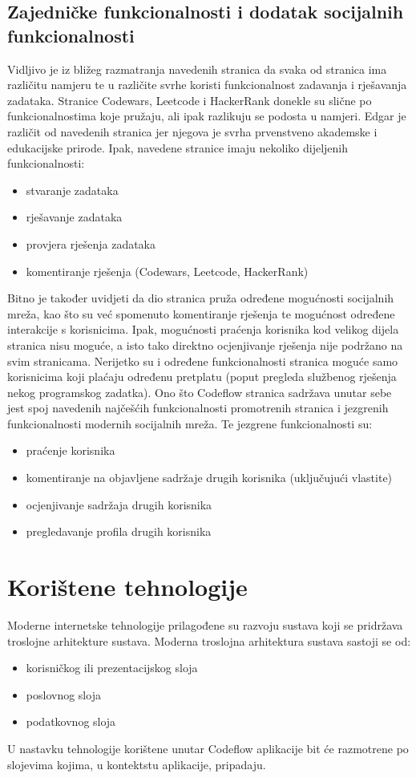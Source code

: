 \documentclass[times, utf8, zavrsni]{fer}
\begin{document}
		\section{Zajedničke funkcionalnosti i dodatak socijalnih funkcionalnosti}
		Vidljivo je iz bližeg razmatranja navedenih stranica da svaka od stranica ima različitu namjeru te u različite svrhe koristi funkcionalnost zadavanja i rješavanja zadataka. Stranice Codewars, Leetcode i HackerRank donekle su slične po funkcionalnostima koje pružaju, ali ipak razlikuju se podosta u namjeri. Edgar je različit od navedenih stranica jer njegova je svrha prvenstveno akademske i edukacijske prirode. Ipak, navedene stranice imaju nekoliko dijeljenih funkcionalnosti:
		\begin{itemize}
			\item stvaranje zadataka
			\item rješavanje zadataka
			\item provjera rješenja zadataka
			\item komentiranje rješenja (Codewars, Leetcode, HackerRank)
		\end{itemize}
		Bitno je također uvidjeti da dio stranica pruža određene mogućnosti socijalnih mreža, kao što su već spomenuto komentiranje rješenja te mogućnost određene interakcije s korisnicima. Ipak, mogućnosti praćenja korisnika kod velikog dijela stranica nisu moguće, a isto tako direktno ocjenjivanje rješenja nije podržano na svim stranicama. Nerijetko su i određene funkcionalnosti stranica moguće samo korisnicima koji plaćaju određenu pretplatu (poput pregleda službenog rješenja nekog programskog zadatka).
		Ono što Codeflow stranica sadržava unutar sebe jest spoj navedenih najčešćih funkcionalnosti promotrenih stranica i jezgrenih funkcionalnosti modernih socijalnih mreža. Te jezgrene funkcionalnosti su:
		\begin{itemize}
			\item praćenje korisnika
			\item komentiranje na objavljene sadržaje drugih korisnika (uključujući vlastite)
			\item ocjenjivanje sadržaja drugih korisnika
			\item pregledavanje profila drugih korisnika
		\end{itemize}
	
	
	\chapter{Korištene tehnologije}
	\label{cha:tehnologije}
	Moderne internetske tehnologije prilagođene su razvoju sustava koji se pridržava troslojne arhitekture sustava. Moderna troslojna arhitektura sustava sastoji se od:
	\begin{itemize}
		\item korisničkog ili prezentacijskog sloja
		\item poslovnog sloja
		\item podatkovnog sloja
	\end{itemize}
	U nastavku tehnologije korištene unutar Codeflow aplikacije bit će razmotrene po slojevima kojima, u kontektstu aplikacije, pripadaju.
	
\end{document}
